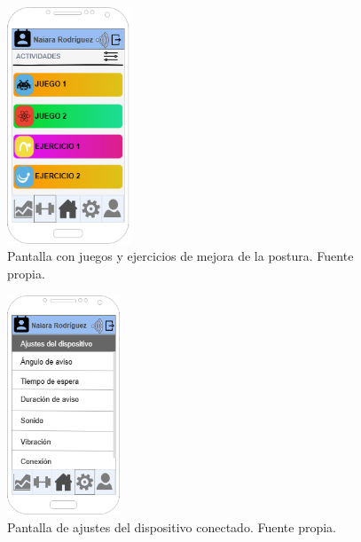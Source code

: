 \begin{figure}[h]
    \centering
    \includegraphics[width=0.33\textwidth]{img/Ejercicios.png}
    \caption{Pantalla con juegos y ejercicios de mejora de la postura. Fuente propia.}
    \label{fig:ejercicios} 
\end{figure}

\begin{figure}[h]
    \centering
    \includegraphics[width=0.3\textwidth]{img/PantallaAjustes.png}
    \caption{Pantalla de ajustes del dispositivo conectado. Fuente propia.}
    \label{fig:ajustes} 
\end{figure}

